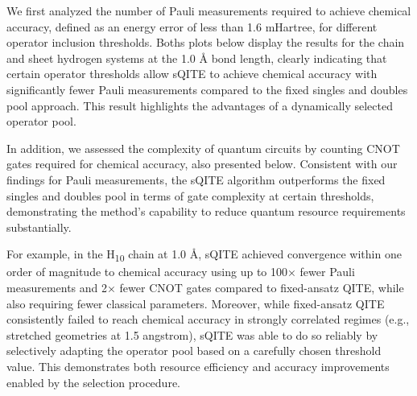\documentclass[aip,jcp,amsmath,amssymb, reprint]{revtex4-1}
\begin{document}

We first analyzed the number of Pauli measurements required to achieve chemical accuracy, defined as an energy error of less than 1.6 mHartree, for different operator inclusion thresholds. Boths plots below display the results for the chain and sheet hydrogen systems at the 1.0 Å bond length, clearly indicating that certain operator thresholds allow sQITE to achieve chemical accuracy with significantly fewer Pauli measurements compared to the fixed singles and doubles pool approach. This result highlights the advantages of a dynamically selected operator pool.

In addition, we assessed the complexity of quantum circuits by counting CNOT gates required for chemical accuracy, also presented below. Consistent with our findings for Pauli measurements, the sQITE algorithm outperforms the fixed singles and doubles pool in terms of gate complexity at certain thresholds, demonstrating the method's capability to reduce quantum resource requirements substantially.

For example, in the H\textsubscript{10} chain at 1.0 \AA{}, sQITE achieved convergence within one order of magnitude to chemical accuracy using up to 100× fewer Pauli measurements and 2× fewer CNOT gates compared to fixed-ansatz QITE, while also requiring fewer classical parameters. Moreover, while fixed-ansatz QITE consistently failed to reach chemical accuracy in strongly correlated regimes (e.g., stretched geometries at 1.5 angstrom), sQITE was able to do so reliably by selectively adapting the operator pool based on a carefully chosen threshold value. This demonstrates both resource efficiency and accuracy improvements enabled by the selection procedure.
\end{document}
